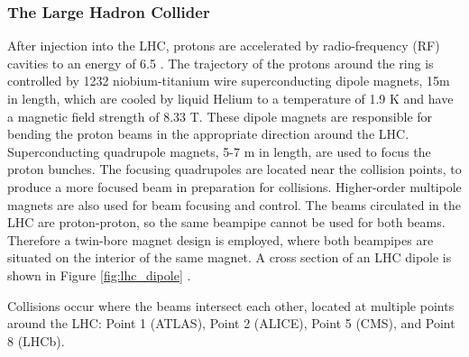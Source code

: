 \subsubsection{The Large Hadron Collider}
After injection into the LHC, protons are accelerated by radio-frequency (RF) cavities to an energy of 6.5 \TeV. 
The trajectory of the protons around the ring is controlled by 1232 niobium-titanium wire superconducting dipole magnets, 15m in length, which are cooled by liquid Helium to a temperature of 1.9 K and have a magnetic field strength of 8.33 T. These dipole magnets are responsible for bending the proton beams in the appropriate direction around the LHC. Superconducting quadrupole magnets, 5-7 m in length, are used to focus the proton bunches.  The focusing quadrupoles are located near the collision points, to produce a more focused beam in preparation for collisions. Higher-order multipole magnets are also used for beam focusing and control. 
The beams circulated in the LHC are proton-proton, so the same beampipe cannot be used for both beams. Therefore a twin-bore magnet design is employed, where both beampipes are situated on the interior of the same magnet. A cross section of an LHC dipole is shown in Figure \ref{fig:lhc_dipole} \cite{Bruning:2004ej}.


Collisions occur where the beams intersect each other, located at multiple points around the LHC: Point 1 (ATLAS), Point 2 (ALICE), Point 5 (CMS), and Point 8 (LHCb). 